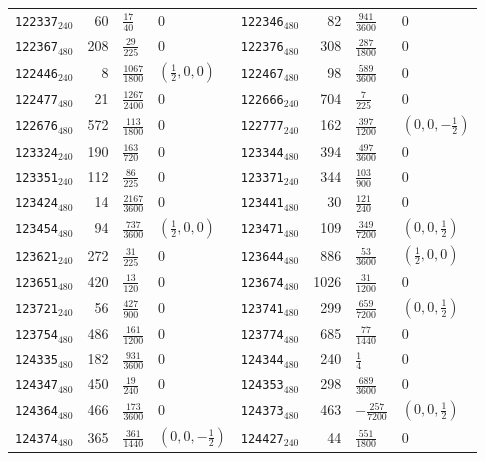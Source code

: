 {\begin{longtable}{@{}lrll@{\hspace{2em}}lrll@{}}
\texttt{122337}$_{240}$ & 60 & $\tfrac{17}{40}$ & 0 & \texttt{122346}$_{480}$ & 82 & $\tfrac{941}{3600}$ & 0\\
\texttt{122367}$_{480}$ & 208 & $\tfrac{29}{225}$ & 0 & \texttt{122376}$_{480}$ & 308 & $\tfrac{287}{1800}$ & 0\\
\texttt{122446}$_{240}$ & 8 & $\tfrac{1067}{1800}$ & $(\tfrac{1}{2},0,0)$ & \texttt{122467}$_{480}$ & 98 & $\tfrac{589}{3600}$ & 0\\
\texttt{122477}$_{480}$ & 21 & $\tfrac{1267}{2400}$ & 0 & \texttt{122666}$_{240}$ & 704 & $\tfrac{7}{225}$ & 0\\
\texttt{122676}$_{480}$ & 572 & $\tfrac{113}{1800}$ & 0 & \texttt{122777}$_{240}$ & 162 & $\tfrac{397}{1200}$ & $(0,0,-\tfrac{1}{2})$\\
\texttt{123324}$_{240}$ & 190 & $\tfrac{163}{720}$ & 0 & \texttt{123344}$_{480}$ & 394 & $\tfrac{497}{3600}$ & 0\\
\texttt{123351}$_{240}$ & 112 & $\tfrac{86}{225}$ & 0 & \texttt{123371}$_{240}$ & 344 & $\tfrac{103}{900}$ & 0\\
\texttt{123424}$_{480}$ & 14 & $\tfrac{2167}{3600}$ & 0 & \texttt{123441}$_{480}$ & 30 & $\tfrac{121}{240}$ & 0\\
\texttt{123454}$_{480}$ & 94 & $\tfrac{737}{3600}$ & $(\tfrac{1}{2},0,0)$ & \texttt{123471}$_{480}$ & 109 & $\tfrac{349}{7200}$ & $(0,0,\tfrac{1}{2})$\\
\texttt{123621}$_{240}$ & 272 & $\tfrac{31}{225}$ & 0 & \texttt{123644}$_{480}$ & 886 & $\tfrac{53}{3600}$ & $(\tfrac{1}{2},0,0)$\\
\texttt{123651}$_{480}$ & 420 & $\tfrac{13}{120}$ & 0 & \texttt{123674}$_{480}$ & 1026 & $\tfrac{31}{1200}$ & 0\\
\texttt{123721}$_{240}$ & 56 & $\tfrac{427}{900}$ & 0 & \texttt{123741}$_{480}$ & 299 & $\tfrac{659}{7200}$ & $(0,0,\tfrac{1}{2})$\\
\texttt{123754}$_{480}$ & 486 & $\tfrac{161}{1200}$ & 0 & \texttt{123774}$_{480}$ & 685 & $\tfrac{77}{1440}$ & 0\\
\texttt{124335}$_{480}$ & 182 & $\tfrac{931}{3600}$ & 0 & \texttt{124344}$_{480}$ & 240 & $\tfrac{1}{4}$ & 0\\
\texttt{124347}$_{480}$ & 450 & $\tfrac{19}{240}$ & 0 & \texttt{124353}$_{480}$ & 298 & $\tfrac{689}{3600}$ & 0\\
\texttt{124364}$_{480}$ & 466 & $\tfrac{173}{3600}$ & 0 & \texttt{124373}$_{480}$ & 463 & $-\tfrac{257}{7200}$ & $(0,0,\tfrac{1}{2})$\\
\texttt{124374}$_{480}$ & 365 & $\tfrac{361}{1440}$ & $(0,0,-\tfrac{1}{2})$ & \texttt{124427}$_{240}$ & 44 & $\tfrac{551}{1800}$ & 0\\

\end{longtable}}
